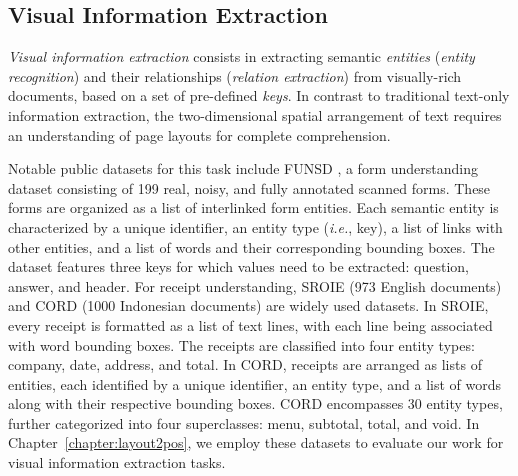 \subsection{Visual Information Extraction}
\label{section:related-document-understanding-visual-information-extraction}

  

\textit{Visual information extraction} consists in extracting semantic \textit{entities} (\textit{entity recognition}) and their relationships (\textit{relation extraction}) from visually-rich documents, based on a set of pre-defined \textit{keys}. In contrast to traditional text-only information extraction, the two-dimensional spatial arrangement of text requires an understanding of page layouts for complete comprehension. 

Notable public datasets for this task include \ac{FUNSD} \citep{jaume2019funsd}, a form understanding dataset consisting of 199 real, noisy, and fully annotated scanned forms. These forms are organized as a list of interlinked form entities. Each semantic entity is characterized by a unique identifier, an entity type (\textit{i.e.}, key), a list of links with other entities, and a list of words and their corresponding bounding boxes. The dataset features three keys for which values need to be extracted: question, answer, and header. For receipt understanding, \ac{SROIE} \citep{huang2019icdar2019} (973 English documents) and \ac{CORD} \citep{park2019cord} (1000 Indonesian documents) are widely used datasets. In \ac{SROIE}, every receipt is formatted as a list of text lines, with each line being associated with word bounding boxes. The receipts are classified into four entity types: company, date, address, and total. In \ac{CORD}, receipts are arranged as lists of entities, each identified by a unique identifier, an entity type, and a list of words along with their respective bounding boxes. \ac{CORD} encompasses 30 entity types, further categorized into four superclasses: menu, subtotal, total, and void. In Chapter~\ref{chapter:layout2pos}, we employ these datasets to evaluate our work for visual information extraction tasks.

